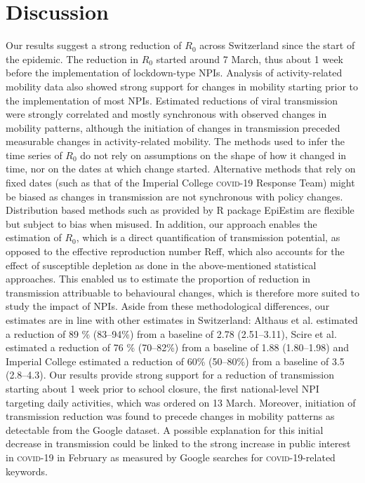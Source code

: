 \section{Discussion}
Our results suggest a strong reduction of $R_0$ across Switzerland since the start of the epidemic. The reduction in $R_0$ started around 7 March, thus about 1 week before the implementation of lockdown-type NPIs. Analysis of activity-related mobility data also showed strong support for changes in mobility starting prior to the implementation of most NPIs. Estimated reductions of viral transmission were strongly correlated and mostly synchronous with observed changes in mobility patterns, although the initiation of changes in transmission preceded measurable changes in activity-related mobility. The methods used to infer the time series of $R_0$ do not rely on assumptions on the shape of how it changed in time, nor on the dates at which change started. Alternative methods that rely on fixed dates (such as that of the Imperial College \textsc{covid}-19 Response Team\cite{Flaxman:Report13Estimating:2020}) might be biased as changes in transmission are not synchronous with policy changes. Distribution based methods such as provided by R package EpiEstim\cite{Wallinga:DifferentEpidemicCurves:2004,Cori:NewFrameworkSoftware:2013} are flexible but subject to bias when misused\cite{Lipsitch:CommentPanLiu:2020}. In addition, our approach enables the estimation of $R_0$, which is a direct quantification of transmission potential, as opposed to the effective reproduction number Reff, which also accounts for the effect of susceptible depletion as done in the above-mentioned statistical approaches. This enabled us to estimate the proportion of reduction in transmission attribuable to behavioural changes, which is therefore more suited to study the impact of NPIs. Aside from these methodological differences, our estimates are in line with other estimates in Switzerland: Althaus et al.\cite{Althaus:RealtimeModelingProjections:2020} estimated a reduction of 89 \% (83–94\%) from a baseline of 2.78 (2.51–3.11), Scire et al.\cite{Scire:ReproductiveNumberCOVID19:2020} estimated a reduction of 76 \% (70–82\%) from a baseline of 1.88 (1.80–1.98) and Imperial College estimated a reduction of 60\% (50–80\%) from a baseline of 3.5 (2.8–4.3)\cite{Flaxman:Report13Estimating:2020}. Our results provide strong support for a reduction of transmission starting about 1 week prior to school closure, the first national-level NPI targeting daily activities, which was ordered on 13 March. Moreover, initiation of transmission reduction was found to precede changes in mobility patterns as detectable from the Google dataset. A possible explanation for this initial decrease in transmission could be linked to the strong increase in public interest in \textsc{covid}-19 in February as measured by Google searches for \textsc{covid}-19-related keywords.

